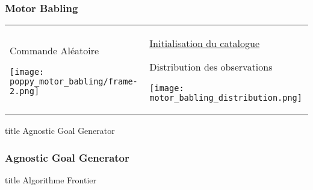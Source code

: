 \documentclass[french]{beamer}
\begin{document}

\begin{frame}
    \frametitle{Motor Babling}

    \begin{tabular}{m{} m{}}
        
        Commande Aléatoire

        \texttt{[image: poppy\_motor\_babling/frame-2.png]}

        &

        \Large
        \underline{Initialisation du catalogue}

        \vspace{10mm}

        \normalsize
        \center
        Distribution des observations

        \texttt{[image: motor\_babling\_distribution.png]}


    \end{tabular}

\end{frame}


\begin{frame}
    \vfill
    \centering
    \begin{beamercolorbox}[sep=8pt,center,shadow=true,rounded=true]{title}
        Agnostic Goal Generator\par
    \end{beamercolorbox}
    \vfill
\end{frame}


\begin{frame}
    \frametitle{Agnostic Goal Generator}

    \center

\end{frame}


\begin{frame}
    \vfill
    \centering
    \begin{beamercolorbox}[sep=8pt,center,shadow=true,rounded=true]{title}
        Algorithme Frontier\par
    \end{beamercolorbox}
    \vfill
\end{frame}
\end{document}
